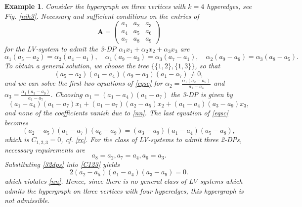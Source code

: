 \documentclass{article}
\newcounter{NN}
\newtheorem{example}[NN]{Example}
\def\A{\mathbf{A}}
\begin{document}
\begin{example} \label{h34}
Consider the hypergraph on three vertices with $k=4$ hyperedges, see Fig. \ref{nih3}. Necessary and sufficient conditions on the entries of
\[
\A=\begin{pmatrix}
a_{1} & a_{2} & a_{3} 
\\
 a_{4} & a_{5} & a_{6} 
\\
 a_{7} & a_{8} & a_{9} 
\end{pmatrix}
\]
for the LV-system to admit the 3-DP $\alpha_1x_1+\alpha_2x_2+\alpha_3x_3$ are
\begin{equation} \label{eqsc}
\alpha_{1} \left(a_{5}-a_{2}\right) = 
\alpha_{2} \left(a_{4}-a_{1}\right),\quad
\alpha_{1} \left(a_{9}-a_{3}\right) = 
\alpha_{3} \left(a_{7}-a_{1}\right),\quad
\alpha_{2} \left(a_{9}-a_{6}\right) = 
\alpha_{3} \left(a_{8}-a_{5}\right).
\end{equation}
To obtain a general solution, we choose the tree $\{\{1,2\},\{1,3\}\}$, so that 
\begin{equation} \label{nn}
\left(a_{5}-a_{2}\right) \left(a_{1}-a_{4}\right) \left(a_{9}-a_{3}\right) \left(a_{1}-a_{7}\right)\neq 0,
\end{equation}
and we can solve the first two equations of \eqref{eqsc} for $
\alpha_{2} = \frac{\alpha_{1} \left(a_{2}-a_{5}\right)}{a_{1}-a_{4}}$ and $\alpha_{3} = \frac{\alpha_{1} \left(a_{3}-a_{9}\right)}{a_{1}-a_{7}}$.
Choosing $\alpha_1=(a_{1}-a_{4})(a_{1}-a_{7})$ the 3-DP is given by
\[
\left(a_{1}-a_{4}\right) \left(a_{1}-a_{7}\right) x_{1}+\left(a_{1}-a_{7}\right) \left(a_{2}-a_{5}\right) x_{2}+\left(a_{1}-a_{4}\right) \left(a_{3}-a_{9}\right) x_{3},
\]
and none of the coefficients vanish due to \eqref{nn}. The last equation of \eqref{eqsc} becomes 
\begin{equation} \label{C123}
\left(a_{2}-a_{5}\right) \left(a_{1}-a_{7}\right) \left(a_{6}-a_{9}\right)=\left(a_{3}-a_{9}\right) \left(a_{1}-a_{4}\right) \left(a_{5}-a_{8}\right),
\end{equation}
which is $C_{1,2,3}=0$, cf. \eqref{rc}.
For the class of LV-systems to admit three 2-DPs, necessary requirements are
\begin{equation} \label{32dps}
a_{8} = a_{2}, a_{7} = a_{4}, a_{6} = a_{3}.
\end{equation}
Substituting \eqref{32dps} into \eqref{C123} yields
\begin{equation} \label{nz}
2 \left(a_{2}-a_{5}\right) \left(a_{1}-a_{4}\right) \left(a_{3}-a_{9}\right)=0.
\end{equation}
which violates \eqref{nn}. Hence, since there is no general class of LV-systems which admits the hypergraph on three vertices with four hyperedges, this hypergraph is not admissible.


\end{example}
\end{document}
